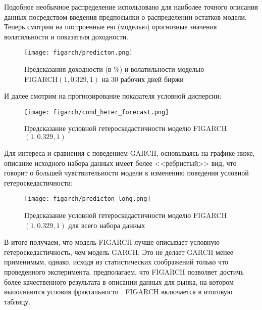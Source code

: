 \noindent Подобное необычное распределение использовано для наиболее точного описания данных посредством введения предпосылки о распределении остатков модели. Теперь смотрим на построенные ею (моделью) прогнозные значения волатильности и показателя доходности.
\begin{figure}[H]
	\centering
	\texttt{[image: figarch/predicton.png]}
	\caption{Предсказания доходности (в \%) и волатильности моделью FIGARCH$(1, 0.329, 1)$ на 30 рабочих дней биржи}
\end{figure}
\noindent И далее смотрим на прогнозирование показателя условной дисперсии:
\begin{figure}[H]
	\centering
	\texttt{[image: figarch/cond\_heter\_forecast.png]}
	\caption{Предсказание условной гетероскедастичности моделю FIGARCH$(1, 0.329, 1)$}
\end{figure}
\noindent Для интереса и сравнения с поведением GARCH, основываясь на графике ниже, описание исходного набора данных имеет более <<ребристый>> вид, что говорит о большей чувствительности модели к изменению поведения условной гетероскедастичности:
\begin{figure}[H]
	\centering
	\texttt{[image: figarch/predicton\_long.png]}
	\caption{Предсказание условной гетероскедастичности моделю FIGARCH$(1, 0.329, 1)$ для всего набора данных}
\end{figure}

\noindent В итоге получаем, что модель FIGARCH лучше описывает условную гетероскедастичность, чем модель GARCH. Это не делает GARCH менее применимым, однако, исходя из статистических соображений только что проведенного эксперимента, предполагаем, что FIGARCH позволяет достичь более качественного результата в описании данных для рынка, на котором выполняются условия фрактальности \cite{fractal_market}. FIGARCH включается в итоговую таблицу.
